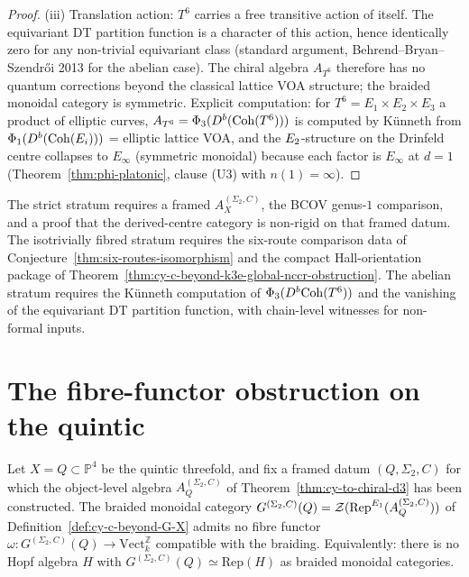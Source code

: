 \begin{proof}
(iii) Translation action: $T^6$ carries a free transitive action of itself. The
equivariant DT partition function is a character of this action, hence identically zero
for any non-trivial equivariant class (standard argument, Behrend--Bryan--Szendr\H{o}i
2013 for the abelian case). The chiral algebra $A_{T^6}$ therefore has no quantum
corrections beyond the classical lattice VOA structure; the braided monoidal category is
symmetric. Explicit computation: for $T^6 = E_1 \times E_2 \times E_3$ a product of
elliptic curves, $A_{T^6} = \Phi_3(D^b(\mathrm{Coh}(T^6)))$ is computed by K\"unneth from
$\Phi_1(D^b(\mathrm{Coh}(E_i)))$ = elliptic lattice VOA, and the $E_{2}$-structure on the
Drinfeld centre collapses to $E_\infty$ (symmetric monoidal) because each factor is
$E_\infty$ at $d = 1$ (Theorem~\ref{thm:phi-platonic}, clause \textup{(U3)}
with $n(1) = \infty$).
\end{proof}

\begin{remark}
\label{rem:cy-c-beyond-proof-obligations}
The strict stratum requires a framed $A_X^{(\Sigma_2,C)}$, the BCOV
genus-$1$ comparison, and a proof that the derived-centre category is
non-rigid on that framed datum. The isotrivially fibred stratum
requires the six-route comparison data of
Conjecture~\ref{thm:six-routes-isomorphism} and the compact
Hall-orientation package of
Theorem~\ref{thm:cy-c-beyond-k3e-global-nccr-obstruction}. The
abelian stratum requires the K\"unneth computation of
$\Phi_3(D^b\mathrm{Coh}(T^6))$ and the vanishing of the equivariant DT
partition function, with chain-level witnesses for non-formal inputs.
\end{remark}

\section{The fibre-functor obstruction on the quintic}
\label{sec:cy-c-beyond-quintic-obstruction}

\begin{proposition}
\label{prop:cy-c-beyond-quintic-fibre-functor}
Let $X = Q \subset \mathbb{P}^4$ be the quintic threefold, and fix a
framed datum $(Q,\Sigma_2,C)$ for which the object-level algebra
$A_Q^{(\Sigma_2,C)}$ of Theorem~\ref{thm:cy-to-chiral-d3} has been
constructed. The braided monoidal category
$G^{(\Sigma_2,C)}(Q) =
\mathcal{Z}(\mathrm{Rep}^{E_{1}}(A_Q^{(\Sigma_2,C)}))$ of
Definition~\ref{def:cy-c-beyond-G-X} admits no fibre functor
$\omega : G^{(\Sigma_2,C)}(Q) \to \mathrm{Vect}_k^{\mathbb{Z}}$
compatible with the braiding.
Equivalently: there is no Hopf algebra $H$ with
$G^{(\Sigma_2,C)}(Q) \simeq \mathrm{Rep}(H)$ as braided monoidal categories.
\end{proposition}

